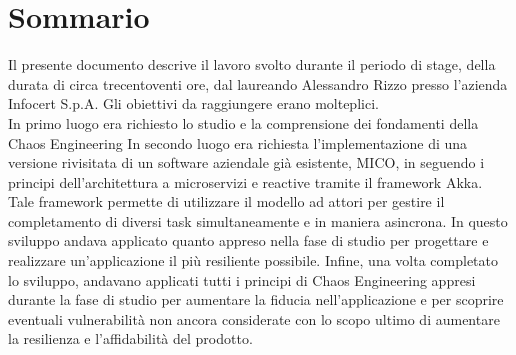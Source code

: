 
{}
{}
\begingroup
\let\clearpage\relax
\let\cleardoublepage\relax
\let\cleardoublepage\relax

\chapter*{Sommario}

Il presente documento descrive il lavoro svolto durante il periodo di stage, della durata di circa trecentoventi ore, dal laureando Alessandro Rizzo presso l'azienda Infocert S.p.A.
Gli obiettivi da raggiungere erano molteplici.\\
In primo luogo era richiesto lo studio e la comprensione dei fondamenti della Chaos Engineering
In secondo luogo era richiesta l'implementazione di una versione rivisitata di un software aziendale già esistente, MICO, in seguendo i principi dell'architettura a microservizi e reactive tramite il framework Akka.
Tale framework permette di utilizzare il modello ad attori per gestire il completamento di diversi task simultaneamente e in maniera asincrona.
In questo sviluppo andava applicato quanto appreso nella fase di studio per progettare e realizzare un'applicazione il più resiliente possibile.
Infine, una volta completato lo sviluppo, andavano applicati tutti i principi di Chaos Engineering appresi durante la fase di studio per aumentare la fiducia nell'applicazione e per scoprire eventuali vulnerabilità non ancora considerate con lo scopo ultimo di aumentare la resilienza e l'affidabilità del prodotto.

%
%

\endgroup			

\vfill

